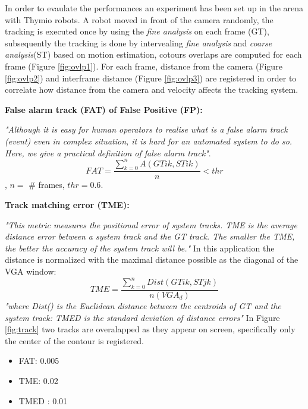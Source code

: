\documentclass[a4paper]{report}
\begin{document}
In order to evaulate the performances an experiment has been set up in the arena with Thymio robots. A robot moved in front of the camera randomly, the tracking is executed once by using the \textit{fine analysis} on each frame (GT), subsequently the tracking is done by intervealing \textit{fine analysis} and \textit{coarse analysis}(ST) based on motion estimation, cotours overlaps are computed for each frame (Figure \ref{fig:ovlp1}). For each frame, distance from the camera (Figure \ref{fig:ovlp2}) and interframe distance (Figure \ref{fig:ovlp3})  are registered in order to correlate how distance from the camera and velocity affects the tracking system.

\textbf{False alarm track (FAT) of False Positive (FP):}

\textit{"Although  it  is easy  for  human  operators  to  realise what  is  a  false  alarm  track  (event)  even  in  complex situation,  it  is  hard for  an automated system to  do  so. Here, we give a practical definition of false alarm track"}\cite{Performance}. $$FAT=\frac{\sum_{k=0}^n A(GTik,  STik)}{n} < thr$$, $n=$ \# frames, $thr = 0.6$.\newline\newline

\textbf{Track matching error (TME):}

\textit{"This metric measures the positional  error  of  system tracks.
TME is the average distance error between a system track  and  the  GT  track.  The  smaller  the  TME,  the better the accuracy of the system track will be."}\cite{Performance}
In this application the distance is normalized with the maximal distance possible as the diagonal of the VGA window: $$TME=\frac{\sum_{k=0}^n Dist(GTik,STjk)}{n (VGA_d)} $$
\textit{"where  Dist()  is  the  Euclidean  distance  between  the centroids of GT and the system track: TMED is  the standard  deviation  of  distance  errors"}\cite{Performance}
In Figure \ref{fig:track} two tracks are overalapped as they appear on screen, specifically only the center of the contour is registered.

\begin{itemize}
    \item FAT: 0.005
    \item TME: 0.02
    \item TMED : 0.01
\end{itemize}
\end{document}
